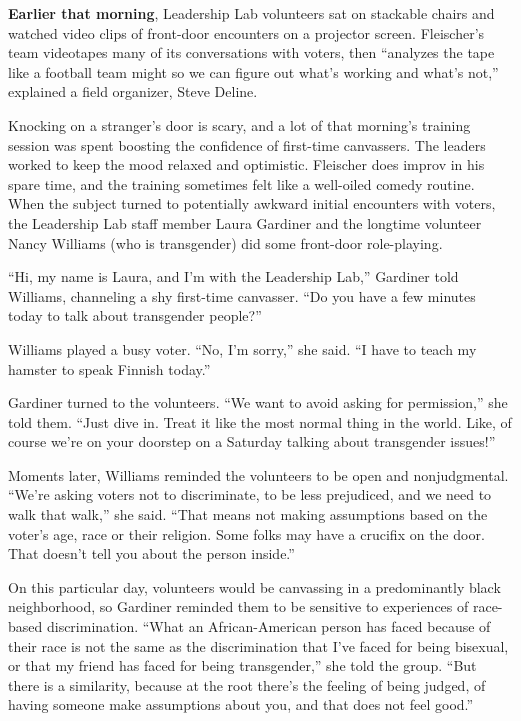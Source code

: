 \textbf{Earlier that morning}, Leadership Lab volunteers sat on
stackable chairs and watched video clips of front-door encounters on a
projector screen. Fleischer's team videotapes many of its conversations
with voters, then ``analyzes the tape like a football team might so we
can figure out what's working and what's not,'' explained a field
organizer, Steve Deline.

Knocking on a stranger's door is scary, and a lot of that morning's
training session was spent boosting the confidence of first-time
canvassers. The leaders worked to keep the mood relaxed and optimistic.
Fleischer does improv in his spare time, and the training sometimes felt
like a well-oiled comedy routine. When the subject turned to potentially
awkward initial encounters with voters, the Leadership Lab staff member
Laura Gardiner and the longtime volunteer Nancy Williams (who is
transgender) did some front-door role-playing.

``Hi, my name is Laura, and I'm with the Leadership Lab,'' Gardiner told
Williams, channeling a shy first-time canvasser. ``Do you have a few
minutes today to talk about transgender people?''

Williams played a busy voter. ``No, I'm sorry,'' she said. ``I have to
teach my hamster to speak Finnish today.''

Gardiner turned to the volunteers. ``We want to avoid asking for
permission,'' she told them. ``Just dive in. Treat it like the most
normal thing in the world. Like, of course we're on your doorstep on a
Saturday talking about transgender issues!''

Moments later, Williams reminded the volunteers to be open and
nonjudgmental. ``We're asking voters not to discriminate, to be less
prejudiced, and we need to walk that walk,'' she said. ``That means not
making assumptions based on the voter's age, race or their religion.
Some folks may have a crucifix on the door. That doesn't tell you about
the person inside.''

On this particular day, volunteers would be canvassing in a
predominantly black neighborhood, so Gardiner reminded them to be
sensitive to experiences of race-based discrimination. ``What an
African-American person has faced because of their race is not the same
as the discrimination that I've faced for being bisexual, or that my
friend has faced for being transgender,'' she told the group. ``But
there is a similarity, because at the root there's the feeling of being
judged, of having someone make assumptions about you, and that does not
feel good.''

